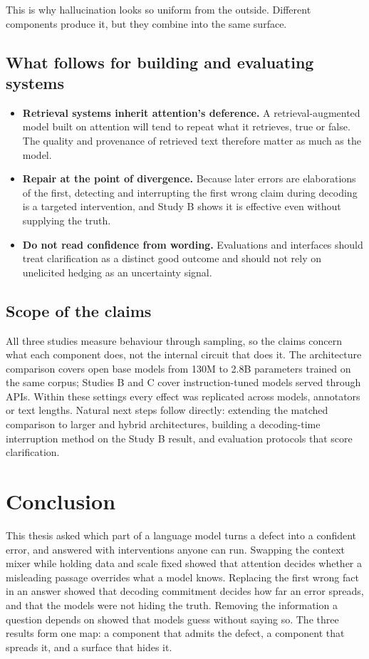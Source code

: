 \documentclass[11pt,a4paper,oneside]{report}
\begin{document}
This is why hallucination looks so uniform from the outside. Different components produce it, but they combine into the same surface.

\section{What follows for building and evaluating systems}
\begin{itemize}
\item \textbf{Retrieval systems inherit attention's deference.} A retrieval-augmented model built on attention will tend to repeat what it retrieves, true or false. The quality and provenance of retrieved text therefore matter as much as the model.
\item \textbf{Repair at the point of divergence.} Because later errors are elaborations of the first, detecting and interrupting the first wrong claim during decoding is a targeted intervention, and Study B shows it is effective even without supplying the truth.
\item \textbf{Do not read confidence from wording.} Evaluations and interfaces should treat clarification as a distinct good outcome and should not rely on unelicited hedging as an uncertainty signal.
\end{itemize}

\section{Scope of the claims}
All three studies measure behaviour through sampling, so the claims concern what each component does, not the internal circuit that does it. The architecture comparison covers open base models from 130M to 2.8B parameters trained on the same corpus; Studies B and C cover instruction-tuned models served through APIs. Within these settings every effect was replicated across models, annotators or text lengths. Natural next steps follow directly: extending the matched comparison to larger and hybrid architectures, building a decoding-time interruption method on the Study B result, and evaluation protocols that score clarification.

\chapter{Conclusion}
\label{ch:conclusion}
This thesis asked which part of a language model turns a defect into a confident error, and answered with interventions anyone can run. Swapping the context mixer while holding data and scale fixed showed that attention decides whether a misleading passage overrides what a model knows. Replacing the first wrong fact in an answer showed that decoding commitment decides how far an error spreads, and that the models were not hiding the truth. Removing the information a question depends on showed that models guess without saying so. The three results form one map: a component that admits the defect, a component that spreads it, and a surface that hides it.
\end{document}
